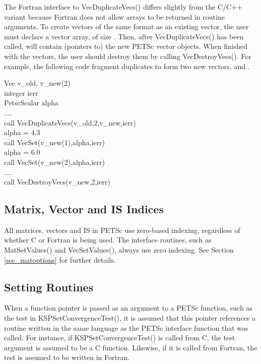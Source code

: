 The Fortran interface to VecDuplicateVecs() differs slightly
from the C/C++ variant because Fortran does not allow arrays to be
returned in routine arguments.  To create  vectors of the same
format as an existing vector, the user must declare a vector array,
 of size .  Then, after VecDuplicateVecs() has
been called,  will contain (pointers to) the new PETSc
vector objects.  When finished with the vectors, the user should
destroy them by calling VecDestroyVecs().
 For example, the following code fragment
duplicates  to form two new vectors,  and .
\begin{tabbing}
   Vec     v\_old, v\_new(2)\\
   integer ierr\\
   PetscScalar  alpha\\
   ....\\
   call VecDuplicateVecs(v\_old,2,v\_new,ierr)\\
   alpha = 4.3\\
   call VecSet(v\_new(1),alpha,ierr)\\
   alpha = 6.0\\
   call VecSet(v\_new(2),alpha,ierr)\\
   ....\\
   call VecDestroyVecs(v\_new,2,ierr)
\end{tabbing}

\subsection{Matrix, Vector and IS Indices}

All matrices, vectors and IS in PETSc use zero-based indexing, regardless
of whether C or Fortran is being used.  The interface routines, such
as MatSetValues() and VecSetValues(), always use zero
indexing.  See Section \ref{sec_matoptions} for further details.

\subsection{Setting Routines}

When a function pointer is passed as an argument to a PETSc function, such as
the test in KSPSetConvergenceTest(), it is assumed that this pointer references
a routine written in the same language as the PETSc interface function that was
called. For instance, if KSPSetConvergenceTest() is called from C, the test
argument is assumed to be a C function. Likewise, if it is called from Fortran,
the test is assumed to be written in Fortran.

